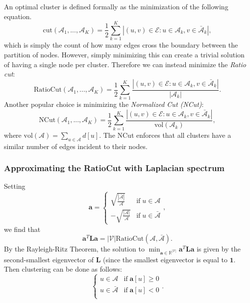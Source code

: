 \documentclass[twocolumn]{article}
\theoremstyle{plain}
\begin{document}
An optimal cluster is defined formally as the minimization of the following equation.
\begin{equation}
    \text{cut}(\mathcal{A}_1, ..., \mathcal{A}_K) = \frac{1}{2}\sum_{k=1}^{K}|(u,v)\in \mathcal{E} : u \in \mathcal{A}_k, v \in \bar{\mathcal{A}}_k|,
\end{equation}
which is simply the count of how many edges cross the boundary between the partition of nodes. However, simply minimizing this can create a trivial solution of having a single node per cluster. Therefore we can instead minimize the \textit{Ratio cut}:
\begin{equation}
    \text{RatioCut}(\mathcal{A}_1, ..., \mathcal{A}_K) = \frac{1}{2}\sum_{k=1}^K\frac{|(u,v)\in \mathcal{E} : u \in \mathcal{A}_k, v\in \bar{\mathcal{A}}_k|}{|\mathcal{A}_k|}.
\end{equation}
Another popular choice is minimizing the \textit{Normalized Cut (NCut)}:
\begin{equation}
    \text{NCut}(\mathcal{A}_1, ..., \mathcal{A}_K) = \frac{1}{2}\sum_{k=1}^K\frac{|(u,v)\in \mathcal{E} : u \in \mathcal{A}_k, v\in \bar{\mathcal{A}}_k|}{\text{vol}(\mathcal{A}_k)},
\end{equation}
where $\text{vol}(\mathcal{A}) = \sum_{u \in \mathcal{A}}d[u]$. The NCut enforces that all clusters have a similar number of edges incident to their nodes.

\subsubsection{Approximating the RatioCut with Laplacian spectrum}

Setting 
\begin{equation}
    \mathbf{a} = \begin{cases}
        \sqrt{\frac{|\bar{\mathcal{A}}|}{\mathcal{A}}} & \text{if} \; u \in \mathcal{A} \\
        -\sqrt{\frac{|\mathcal{A}|}{\mathcal{A}}} & \text{if} \; u \in \bar{\mathcal{A}}
    \end{cases},
\end{equation}
we find that 
\begin{equation}
    \mathbf{a}^T \mathbf{L}\mathbf{a} = |\mathcal{V}|\text{RatioCut}(\mathcal{A}, \bar{\mathcal{A}}).
\end{equation}
By the Rayleigh-Ritz Theorem, the solution to $\min_{\mathbf{a} \in \mathbb{R}^{|\mathcal{V}|}}\mathbf{a}^T\mathbf{L}\mathbf{a}$ is given by the second-smallest eigenvector of $\mathbf{L}$ (since the smallest eigenvector is equal to $\mathbf{1}$. Then clustering can be done as follows:
\begin{equation}
    \begin{cases}
        u \in \mathcal{A} & \text{if} \; \mathbf{a}[u] \geq 0 \\
        u \in \bar{\mathcal{A}} & \text{if} \; \mathbf{a}[u] < 0 \\
    \end{cases}.
\end{equation}
\end{document}
